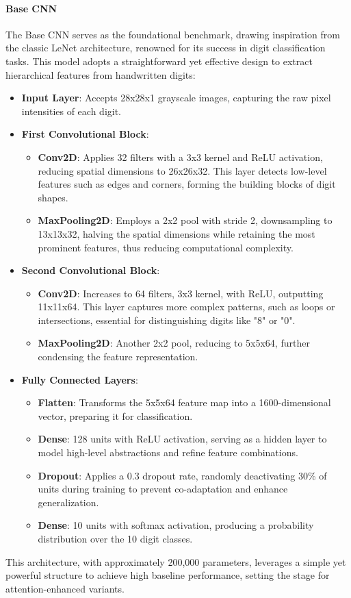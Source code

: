 \documentclass[12pt]{article}
\begin{document}
\paragraph{Base CNN}
The Base CNN serves as the foundational benchmark, drawing inspiration from the classic LeNet architecture, renowned for its success in digit classification tasks. This model adopts a straightforward yet effective design to extract hierarchical features from handwritten digits:
\begin{itemize}
    \item \textbf{Input Layer}: Accepts 28x28x1 grayscale images, capturing the raw pixel intensities of each digit.
    \item \textbf{First Convolutional Block}:
        \begin{itemize}
            \item \textbf{Conv2D}: Applies 32 filters with a 3x3 kernel and ReLU activation, reducing spatial dimensions to 26x26x32. This layer detects low-level features such as edges and corners, forming the building blocks of digit shapes.
            \item \textbf{MaxPooling2D}: Employs a 2x2 pool with stride 2, downsampling to 13x13x32, halving the spatial dimensions while retaining the most prominent features, thus reducing computational complexity.
        \end{itemize}
    \item \textbf{Second Convolutional Block}:
        \begin{itemize}
            \item \textbf{Conv2D}: Increases to 64 filters, 3x3 kernel, with ReLU, outputting 11x11x64. This layer captures more complex patterns, such as loops or intersections, essential for distinguishing digits like "8" or "0".
            \item \textbf{MaxPooling2D}: Another 2x2 pool, reducing to 5x5x64, further condensing the feature representation.
        \end{itemize}
    \item \textbf{Fully Connected Layers}:
        \begin{itemize}
            \item \textbf{Flatten}: Transforms the 5x5x64 feature map into a 1600-dimensional vector, preparing it for classification.
            \item \textbf{Dense}: 128 units with ReLU activation, serving as a hidden layer to model high-level abstractions and refine feature combinations.
            \item \textbf{Dropout}: Applies a 0.3 dropout rate, randomly deactivating 30\% of units during training to prevent co-adaptation and enhance generalization.
            \item \textbf{Dense}: 10 units with softmax activation, producing a probability distribution over the 10 digit classes.
        \end{itemize}
\end{itemize}
This architecture, with approximately 200,000 parameters, leverages a simple yet powerful structure to achieve high baseline performance, setting the stage for attention-enhanced variants.
\end{document}

